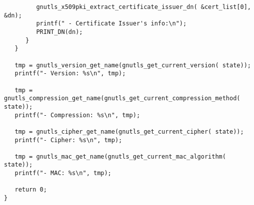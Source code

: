 \begin{verbatim}
         gnutls_x509pki_extract_certificate_issuer_dn( &cert_list[0], &dn);
         printf(" - Certificate Issuer's info:\n");
         PRINT_DN(dn);
      }
   }

   tmp = gnutls_version_get_name(gnutls_get_current_version( state));
   printf("- Version: %s\n", tmp);

   tmp = gnutls_compression_get_name(gnutls_get_current_compression_method( state));
   printf("- Compression: %s\n", tmp);

   tmp = gnutls_cipher_get_name(gnutls_get_current_cipher( state));
   printf("- Cipher: %s\n", tmp);

   tmp = gnutls_mac_get_name(gnutls_get_current_mac_algorithm( state));
   printf("- MAC: %s\n", tmp);

   return 0;
}

\end{verbatim}
